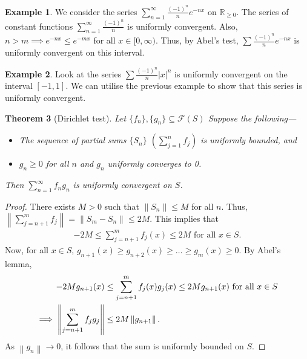 \documentclass[15pt,a4paper]{book}
\newtheorem{theorem}{Theorem}[chapter]
\theoremstyle{definition}
\newtheorem{example}[theorem]{Example}
\newcommand{\abs}[1]{\left| #1 \right|} %
\newcommand{\R}{\mathbb{R}} %
\newcommand{\cF}{\mathcal{F}}
\newcommand{\norm}[1]{\left\lVert#1\right\rVert}
\begin{document}
\begin{example}
    We consider the series $\sum_{n=1}^{\infty} \frac{(-1)^{n}}{n} e^{-nx}$ on $\R_{\geq 0}$. The series of constant functions $\sum_{n=1}^{\infty} \frac{(-1)^{n}}{n}$ is uniformly convergent. Also, $n > m \implies e^{-nx} \leq e^{-mx}$ for all $x \in [0,\infty)$. Thus, by Abel's test, $\sum \frac{(-1)^{n}}{n} e^{-nx}$ is uniformly convergent on this interval.
\end{example}

\begin{example}
    Look at the series $\sum \frac{(-1)^{n}}{n} \abs{x}^{n}$ is uniformly convergent on the interval $[-1,1]$. We can utilise the previous example to show that this series is uniformly convergent.
\end{example}

\begin{theorem}[Dirichlet test]
    Let $\{f_{n}\}, \{g_{n}\} \subseteq \cF(S)$ Suppose the following---
    \begin{itemize}
        \item The sequence of partial sums $\{S_{n}\}$ $(\sum_{j=1}^{n} f_{j})$ is uniformly bounded, and
        \item $g_{n} \geq 0$ for all $n$ and $g_{n}$ uniformly converges to 0.
    \end{itemize}
    Then $\sum_{n=1}^{\infty} f_{n}g_{n}$ is uniformly convergent on $S$.
\end{theorem}
\begin{proof}
    There exists $M > 0$ such that $\norm{S_{n}} \leq M$ for all $n$. Thus, $\norm{\sum_{j=n+1}^{m} f_{j}} = \norm{S_{m}-S_{n}} \leq 2M$. This implies that
    \begin{align}
        -2M \leq \sum_{j=n+1}^{m} f_{j}(x) \leq 2M \text{ for all } x \in S.
    \end{align}
    Now, for all $x \in S$, $g_{n+1}(x) \geq g_{n+2}(x) \geq \ldots \geq g_{m}(x) \geq 0$. By Abel's lemma,
    \begin{align}
        -2M g_{n+1}(x) &\leq \sum_{j=n+1}^{m} f_{j}(x)g_{j}(x) \leq 2Mg_{n+1}(x) \text{ for all } x \in S \notag \\
        \implies \norm{\sum_{j=n+1}^{m} f_{j}g_{j}} &\leq 2M \norm{g_{n+1}}.
    \end{align}
    As $\norm{g_{n}} \to 0$, it follows that the sum is uniformly bounded on $S$.
\end{proof}
\end{document}
